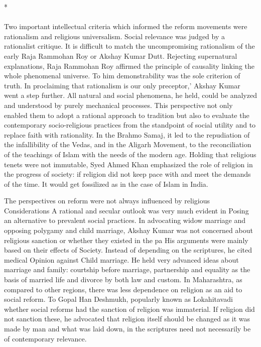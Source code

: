 \begin{center}*\end{center}

\paragraph*{}


Two important intellectual criteria which informed the reform movements were rationalism and religious universalism. Social relevance was judged by a rationalist critique. It is difficult to match the uncompromising rationalism of the early Raja Rammohan Roy or Akshay Kumar Dutt. Rejecting supernatural explanations, Raja Rammohan Roy affirmed the principle of causality linking the whole phenomenal universe. To him demonstrability was the sole criterion of truth. In proclaiming that rationalism is our only preceptor,' Akshay Kumar went a step further. All natural and social phenomena, he held, could be analyzed and understood by purely mechanical processes. This perspective not only enabled them to adopt a rational approach to tradition but also to evaluate the contemporary socio-religious practices from the standpoint of social utility and to replace faith with rationality. In the Brahmo Samaj, it led to the repudiation of the infallibility of the Vedas, and in the Aligarh Movement, to the reconciliation of the teachings of Islam with the needs of the modern age. Holding that religious tenets were not immutable, Syed Ahmed Khan emphasized the role of religion in the progress of society: if religion did not keep pace with and meet the demands of the time. It would get fossilized as in the case of Islam in India.

The perspectives on reform were not always influenced by religious Considerations A rational and secular outlook was very much evident in Posing an alternative to prevalent social practices. In advocating widow marriage and opposing polygamy and child marriage, Akshay Kumar was not concerned about religious sanction or whether they existed in the pa His arguments were mainly based on their effects of Society. Instead of depending on the scriptures, he cited medical Opinion against Child marriage. He held very advanced ideas about marriage and family: courtship before marriage, partnership and equality as the basis of married life and divorce by both law and custom. In Maharashtra, as compared to other regions, there was less dependence on religion as an aid to social reform. To Gopal Han Deshmukh, popularly known as Lokahitavadi whether social reforms had the sanction of religion was immaterial. If religion did not sanction these, he advocated that religion itself should be changed as it was made by man and what was laid down, in the scriptures need not necessarily be of contemporary relevance.

